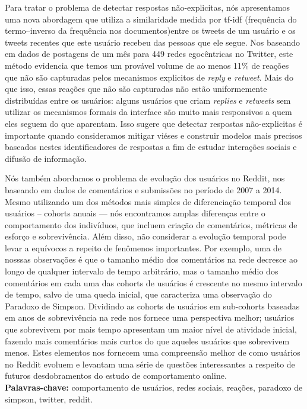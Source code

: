 \documentclass[11pt,twoside,a4paper]{book}
\begin{document}
Para tratar o problema de detectar respostas não-explicitas, nós apresentamos uma nova abordagem que utiliza a similaridade medida por tf-idf (frequência do termo–inverso da frequência nos documentos)entre os tweets de um usuário e os tweets recentes que este usuário recebeu das pessoas que ele segue. Nos baseando em dados de postagens de um mês para 449 redes egocêntricas no Twitter, este método evidencia que temos um provável volume de ao menos 11\% de reações que não são capturadas pelos mecanismos explicitos de \textit{reply} e \textit{retweet}. Mais do que isso, essas reações que não são capturadas não estão uniformemente distribuídas entre os usuários: alguns usuários que criam \textit{replies} e \textit{retweets} sem utilizar os mecanismos formais da interface são muito mais responsivos a quem eles seguem do que aparentam. Isso sugere que detectar respostas não-explicitas é importante quando consideramos mitigar viéses e construir modelos mais precisos baseados nestes identificadores de respostas a fim de estudar interações sociais e difusão de informação. 

Nós também abordamos o problema de evolução dos usuários no Reddit, nos baseando em dados de comentários e submissões no período de 2007 a 2014. Mesmo utilizando um dos métodos mais simples de diferenciação temporal dos usuários -- cohorts anuais --- nós encontramos amplas diferenças entre o comportamento dos indivíduos, que incluem criação de comentários, métricas de esforço e sobrevivência. Além disso, não considerar a evolução temporal pode levar a equívocos a repeito de fenômenos importantes. Por exemplo, uma de nosssas observações é que o tamanho médio dos comentários na rede decresce ao longo de qualquer intervalo de tempo arbitrário, mas o tamanho médio dos comentários em cada uma das cohorts de usuários é crescente no mesmo intervalo de tempo, salvo de uma queda inicial, que caracteriza uma observação do Paradoxo de Simpson. Dividindo as cohorts de usuários em sub-cohorts baseadas em anos de sobrevivência na rede nos fornece uma perspectiva melhor;  usuários que sobrevivem por mais tempo apresentam um maior nível de atividade inicial, fazendo mais comentários mais curtos do que aqueles usuários que sobrevivem menos. Estes elementos nos fornecem uma compreensão melhor de como usuários no Reddit evoluem e levantam uma série de questões interessantes a respeito de futuros desdobramentos do estudo de comportamento online.
\\

\noindent \textbf{Palavras-chave:} comportamento de usuários, redes sociais, reações, paradoxo de simpson, twitter, reddit.
\end{document}
